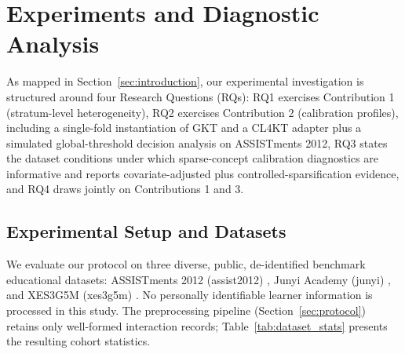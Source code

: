 \section{Experiments and Diagnostic Analysis}
\label{sec:experiments}

As mapped in Section~\ref{sec:introduction}, our experimental investigation is structured around four Research Questions (RQs): RQ1 exercises Contribution 1 (stratum-level heterogeneity), RQ2 exercises Contribution 2 (calibration profiles), including a single-fold instantiation of GKT and a CL4KT adapter plus a simulated global-threshold decision analysis on ASSISTments 2012, RQ3 states the dataset conditions under which sparse-concept calibration diagnostics are informative and reports covariate-adjusted plus controlled-sparsification evidence, and RQ4 draws jointly on Contributions 1 and 3.

\subsection{Experimental Setup and Datasets}
We evaluate our protocol on three diverse, public, de-identified benchmark educational datasets: ASSISTments 2012 (assist2012) \citep{assistments2012data,liu2022pykt}, Junyi Academy (junyi) \citep{junyi2019kaggle}, and XES3G5M (xes3g5m) \citep{liu2023xes3g5m}. No personally identifiable learner information is processed in this study. The preprocessing pipeline (Section~\ref{sec:protocol}) retains only well-formed interaction records; Table~\ref{tab:dataset_stats} presents the resulting cohort statistics.


